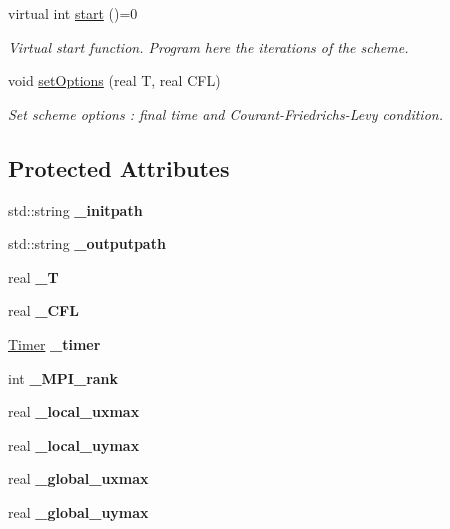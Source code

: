 \begin{DoxyCompactItemize}
\mbox{\label{classEngine_a133fbaf71f1fb7a2c7eccc9f3482e923}} 
virtual int \hyperlink{classEngine_a133fbaf71f1fb7a2c7eccc9f3482e923}{start} ()=0
\begin{DoxyCompactList}\small\item\em Virtual start function. Program here the iterations of the scheme. \end{DoxyCompactList}\item 
void \hyperlink{classEngine_a6837cf148e122390a924718435cea117}{set\+Options} (real T, real C\+FL)
\begin{DoxyCompactList}\small\item\em Set scheme options \+: final time and Courant-\/\+Friedrichs-\/\+Levy condition. \end{DoxyCompactList}\end{DoxyCompactItemize}
\subsection*{Protected Attributes}
\begin{DoxyCompactItemize}
\item 
\mbox{\label{classEngine_ae12535c5ba837c7ea2636f76678132fe}} 
std\+::string {\bfseries \+\_\+initpath}
\item 
\mbox{\label{classEngine_adf268ff3f02e5c4a4d9e987c5eb1d925}} 
std\+::string {\bfseries \+\_\+outputpath}
\item 
\mbox{\label{classEngine_ad868f62c35249da60df7aba62151e6dd}} 
real {\bfseries \+\_\+T}
\item 
\mbox{\label{classEngine_a1c37d4f8d2f9c46afeb5356bb496bde4}} 
real {\bfseries \+\_\+\+C\+FL}
\item 
\mbox{\label{classEngine_a08555133228ffdf91eca97451f777ef2}} 
\hyperlink{classTimer}{Timer} {\bfseries \+\_\+timer}
\item 
\mbox{\label{classEngine_a4e9850fba1cc1df1ab81d5ea6b9f6c82}} 
int {\bfseries \+\_\+\+M\+P\+I\+\_\+rank}
\item 
\mbox{\label{classEngine_a7a98c3603acb4e7307a8b0d85d343d0e}} 
real {\bfseries \+\_\+local\+\_\+uxmax}
\item 
\mbox{\label{classEngine_a1eded88d22b94930016fa3ebb15220a8}} 
real {\bfseries \+\_\+local\+\_\+uymax}
\item 
\mbox{\label{classEngine_a0d373ca305a80d5f4ce11b134cb8ceec}} 
real {\bfseries \+\_\+global\+\_\+uxmax}
\item 
\mbox{\label{classEngine_a7897d701a5a9cdda6d6aabaae97fb47d}} 
real {\bfseries \+\_\+global\+\_\+uymax}
\end{DoxyCompactItemize}


